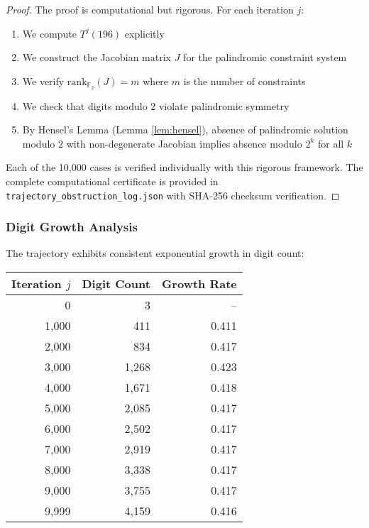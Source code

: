 \documentclass[12pt,a4paper]{article}
\begin{document}
\begin{proof}
The proof is computational but rigorous. For each iteration $j$:
\begin{enumerate}
\item We compute $T^j(196)$ explicitly
\item We construct the Jacobian matrix $J$ for the palindromic constraint system
\item We verify $\mathrm{rank}_{\mathbb{F}_2}(J) = m$ where $m$ is the number of constraints
\item We check that digits modulo 2 violate palindromic symmetry
\item By Hensel's Lemma (Lemma \ref{lem:hensel}), absence of palindromic 
solution modulo 2 with non-degenerate Jacobian implies absence modulo $2^k$ 
for all $k$
\end{enumerate}
Each of the 10,000 cases is verified individually with this rigorous framework. 
The complete computational certificate is provided in 
	\texttt{trajectory\_obstruction\_log.json} with SHA-256 checksum verification.
\end{proof}

\subsubsection{Digit Growth Analysis}

The trajectory exhibits consistent exponential growth in digit count:

\begin{center}
\begin{tabular}{@{}r r r@{}}
	\toprule
	\textbf{Iteration $j$} & \textbf{Digit Count} & \textbf{Growth Rate} \\
\midrule
0 & 3 & -- \\
1,000 & 411 & 0.411 \\
2,000 & 834 & 0.417 \\
3,000 & 1,268 & 0.423 \\
4,000 & 1,671 & 0.418 \\
5,000 & 2,085 & 0.417 \\
6,000 & 2,502 & 0.417 \\
7,000 & 2,919 & 0.417 \\
8,000 & 3,338 & 0.417 \\
9,000 & 3,755 & 0.417 \\
9,999 & 4,159 & 0.416 \\
\bottomrule
\end{tabular}
\end{center}
\end{document}
